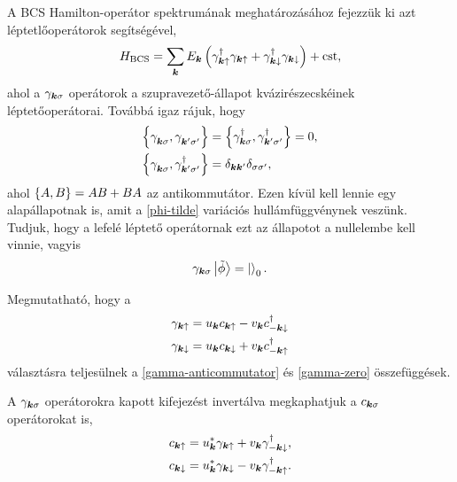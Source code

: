 \documentclass[a4paper,12pt,titlepage]{article}
\newcommand{\KK}{{\vb*{k}}}
\newcommand{\phantomdagger}{{\phantom{\dagger}}}
\begin{document}
A BCS Hamilton-operátor spektrumának meghatározásához fejezzük ki azt léptetlőoperátorok segítségével,
\begin{equation} \label{H-BCS}
	H_\text{BCS} = \sum\limits_\KK E_\KK \left( \gamma_{\KK \uparrow}^\dagger \gamma_{\KK \uparrow} + \gamma_{\KK \downarrow}^\dagger \gamma_{\KK \downarrow} \right) + \text{cst},
\end{equation}
ahol a $\gamma_{\KK \sigma}$ operátorok a szupravezető-állapot kvázirészecskéinek léptetőoperátorai.  Továbbá igaz rájuk, hogy
\begin{equation} \label{gamma-anticommutator}
\begin{split}
	\anticommutator{\gamma_{\KK \sigma}^\phantomdagger}{\gamma_{\KK^\prime \sigma^\prime}^\phantomdagger} & = \anticommutator{\gamma_{\KK \sigma}^\dagger}{\gamma_{\KK^\prime \sigma^\prime}^\dagger} = 0, \\
	\anticommutator{\gamma_{\KK \sigma}^\phantomdagger}{\gamma_{\KK^\prime \sigma^\prime}^\dagger} & = \delta_{\KK \KK^\prime} \delta_{\sigma \sigma^\prime},
\end{split}
\end{equation}
ahol $\anticommutator{A}{B} = AB + BA$ az antikommutátor.  Ezen kívül kell lennie egy alapállapotnak is, amit a \eqref{phi-tilde} variációs hullámfüggvénynek veszünk.  Tudjuk, hogy a lefelé léptető operátornak ezt az állapotot a nullelembe kell vinnie, vagyis
\begin{equation} \label{gamma-zero}
	\gamma_{\KK \sigma} \ket{\tilde{\phi}} = \ket{}_0.
\end{equation}

Megmutatható, hogy a
\begin{equation} \label{gamma-def}
\begin{split}
	\gamma_{\KK \uparrow} & = u_\KK c_{\KK \uparrow} - v_\KK c_{-\KK \downarrow}^\dagger \\
	\gamma_{\KK \downarrow} & = u_\KK c_{\KK \downarrow} + v_\KK c_{-\KK \uparrow}^\dagger
\end{split}
\end{equation}
választásra teljesülnek a \eqref{gamma-anticommutator} és \eqref{gamma-zero} összefüggések.

A $\gamma_{\KK \sigma}$ operátorokra kapott kifejezést invertálva megkaphatjuk a $c_{\KK \sigma}$ operátorokat is,
\begin{equation}
\begin{split}
	c_{\KK \uparrow} & = u_\KK^* \gamma_{\KK \uparrow} + v_\KK \gamma_{-\KK \downarrow}^\dagger, \\
	c_{\KK \downarrow} & = u_\KK^* \gamma_{\KK \downarrow} - v_\KK \gamma_{-\KK \uparrow}^\dagger.
\end{split}
\end{equation}
\end{document}
